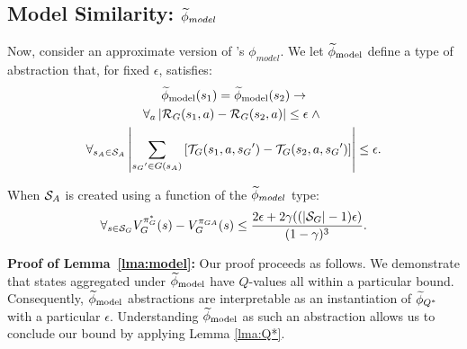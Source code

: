 \subsection{Model Similarity: $\widetilde \phi_{model}$}
\label{sec:model}

Now, consider an approximate version of \citeauthor{li2006towards}'s $\phi_{model}$. 
\bdefn{$\epM$}
We let $\epM$ define a type of abstraction that, for fixed $\epsilon$, satisfies:
\begin{multline}
\widetilde \phi_{\text{model}}(s_1) = \widetilde \phi_{\text{model}}(s_2) \rightarrow \\
\forall_a \left| \mathcal{R}_G(s_1, a) - \mathcal{R}_G(s_2, a)\right| \leq \epsilon\; \wedge\ \\
\forall_{s_A \in \mathcal{S}_A} \left|\sum_{{s_G}' \in G(s_A)} \left[\mathcal{T}_G(s_1, a, {s_G}') - \mathcal{T}_G(s_2, a,{s_G}')\right] \right| \leq \epsilon.
\end{multline}
\edefn

\begin{lma}
\label{lma:model}
When $\mathcal{S}_A$ is created using a function of the $\widetilde \phi_{model}$ type:
\begin{equation}
\forall_{s \in \mathcal{S}_G} V_G^{\pi_G^*}(s) - V_G^{\pi_{GA}}(s) \leq \frac{2\epsilon + 2\gamma((|\mathcal{S}_G|-1)\epsilon)}{(1-\gamma)^3}.
\end{equation}
\end{lma}

{\bf Proof of Lemma~\ref{lma:model}:} Our proof proceeds as follows. We demonstrate that states aggregated under $\epM$ have $Q$-values all within a particular bound. Consequently, $\epM$ abstractions are interpretable as an instantiation of $\widetilde \phi_{Q^*}$ with a particular $\epsilon$. Understanding $\epM$ as such an abstraction allows us to conclude our bound by applying Lemma \ref{lma:Q*}.

